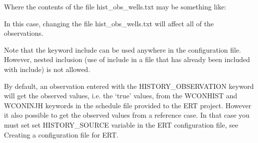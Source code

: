 \documentclass[letterpaper,10pt,english]{sphinxmanual}
\begin{document}
%
\begin{sphinxVerbatim}[commandchars=\\\{\}]
     
     
     
     
     
\end{sphinxVerbatim}

Where the contents of the file hist\_obs\_wells.txt may be something
like:

%
\begin{sphinxVerbatim}[commandchars=\\\{\}]
   
        
    
\end{sphinxVerbatim}

In this case, changing the file hist\_obs\_wells.txt will affect all of
the observations.

Note that the keyword include can be used anywhere in the
configuration file. However, nested inclusion (use of include in a
file that has already been included with include) is not allowed.

By default, an observation entered with the HISTORY\_OBSERVATION
keyword will get the observed values, i.e. the ‘true’ values, from the
WCONHIST and WCONINJH keywords in the schedule file provided to the
ERT project. However it also possible to get the observed values from
a reference case. In that case you must set set HISTORY\_SOURCE
variable in the ERT configuration file, see Creating a configuration
file for ERT.
\end{document}
